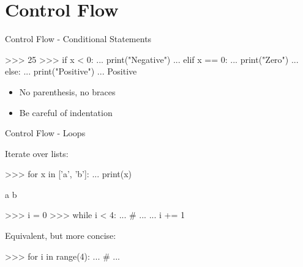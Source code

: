\documentclass[10pt]{beamer}
\begin{document}
\section{Control Flow}


\begin{frame}[fragile]{Control Flow - Conditional Statements}

    \begin{pythoncode}
        >>> 25
        >>> if x < 0:
        ...     print("Negative")
        ... elif x == 0:
        ...     print("Zero")
        ... else:
        ...     print("Positive")
        ...
        Positive

    \end{pythoncode}

    \begin{itemize}
        \item \pause No parenthesis, no braces
        \item \pause Be careful of indentation
    \end{itemize}

\end{frame}


\begin{frame}[fragile]{Control Flow - Loops}

    Iterate over lists:

    \begin{pythoncode}
        >>> for x in ['a', 'b']:
        ...     print(x)

        a
        b
    \end{pythoncode}

    \pause

    \begin{pythoncode}
        >>> i = 0
        >>> while i < 4:
        ...     # ...
        ...     i += 1
    \end{pythoncode}

    Equivalent, but more concise:

    \begin{pythoncode}
        >>> for i in range(4):
        ...     # ...
    \end{pythoncode}

\end{frame}
\end{document}
